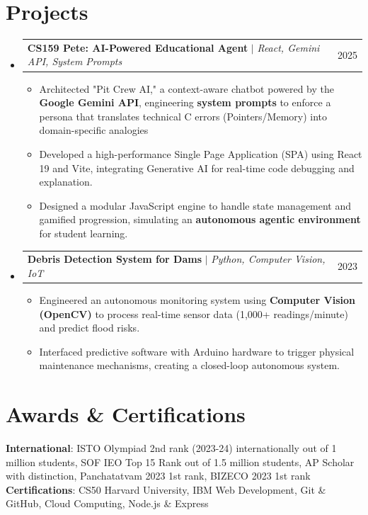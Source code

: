\documentclass[letterpaper,11pt]{article}
\makeatletter
\newcommand{\resumeItem}[1]{
  \item\small{
    {#1 \vspace{-2pt}}
  }
}
\newcommand{\resumeProjectHeading}[2]{
    \item
    \begin{tabular*}{0.97\textwidth}{l@{\extracolsep{\fill}}r}
      \small#1 & #2 \\
    \end{tabular*}\vspace{-7pt}
}
\newcommand{\resumeSubHeadingListStart}{\begin{itemize}[leftmargin=0.15in, label={}]}
\newcommand{\resumeSubHeadingListEnd}{\end{itemize}}
\newcommand{\resumeItemListStart}{\begin{itemize}}
\newcommand{\resumeItemListEnd}{\end{itemize}\vspace{-5pt}}
\makeatother
\begin{document}
\section{Projects}
    \resumeSubHeadingListStart
      \resumeProjectHeading
          {\textbf{CS159 Pete: AI-Powered Educational Agent} $|$ \emph{React, Gemini API, System Prompts}}{2025}
          \resumeItemListStart
            \resumeItem{Architected "Pit Crew AI," a context-aware chatbot powered by the \textbf{Google Gemini API}, engineering \textbf{system prompts} to enforce a persona that translates technical C errors (Pointers/Memory) into domain-specific analogies}
            \resumeItem{Developed a high-performance Single Page Application (SPA) using React 19 and Vite, integrating Generative AI for real-time code debugging and explanation.}
            \resumeItem{Designed a modular JavaScript engine to handle state management and gamified progression, simulating an \textbf{autonomous agentic environment} for student learning.}
          \resumeItemListEnd

      \resumeProjectHeading
          {\textbf{Debris Detection System for Dams} $|$ \emph{Python, Computer Vision, IoT}}{2023}
          \resumeItemListStart
            \resumeItem{Engineered an autonomous monitoring system using \textbf{Computer Vision (OpenCV)} to process real-time sensor data (1,000+ readings/minute) and predict flood risks.}
            \resumeItem{Interfaced predictive software with Arduino hardware to trigger physical maintenance mechanisms, creating a closed-loop autonomous system.}
          \resumeItemListEnd
    \resumeSubHeadingListEnd


\section{Awards \& Certifications}
 \begin{itemize}[leftmargin=0.15in, label={}]
    \small{\item{
     \textbf{International}{: ISTO Olympiad 2nd rank (2023-24) internationally out of 1 million students, SOF IEO Top 15 Rank out of 1.5 million students, AP Scholar with distinction, Panchatatvam 2023 1st rank, BIZECO 2023 1st rank} \\
     \textbf{Certifications}{: CS50 Harvard University, IBM Web Development, Git \& GitHub, Cloud Computing, Node.js \& Express} \\
    }}
 \end{itemize}
\end{document}
